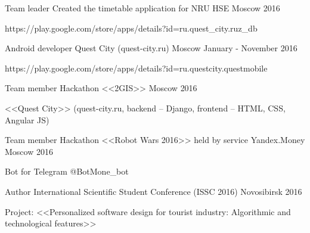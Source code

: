 \begin{cventries}
\cventry
{Team leader} %
{Created the timetable application for NRU HSE} %
{Moscow} %
{2016} %
{ %
	\begin{cvitems}
		\item {https://play.google.com/store/apps/details?id=ru.quest\_city.ruz\_db}
	\end{cvitems}
}



\cventry
{Android developer} %
{Quest City (quest-city.ru)} %
{Moscow} %
{January - November 2016} %
{ %
	\begin{cvitems}
		\item {https://play.google.com/store/apps/details?id=ru.questcity.questmobile}
	\end{cvitems}
}



\cventry
{Team member} %
{Hackathon <<2GIS>>} %
{Moscow} %
{2016} %
{ %
\begin{cvitems}
\item {<<Quest City>> (quest-city.ru, backend – Django, frontend – HTML, CSS, Angular JS)}
\end{cvitems}
}


\cventry
{Team member} %
{Hackathon <<Robot Wars 2016>> held by service Yandex.Money} %
{Moscow} %
{2016} %
{ %
\begin{cvitems}
\item {Bot for Telegram @BotMone\_bot}
\end{cvitems}
}


\cventry
{Author} %
{International Scientific Student Conference (ISSC 2016)} %
{Novosibirsk} %
{2016} %
{ %
\begin{cvitems}
\item {Project: <<Personalized software design for tourist industry: Algorithmic and technological features>>}
\end{cvitems}
}



\end{cventries}
